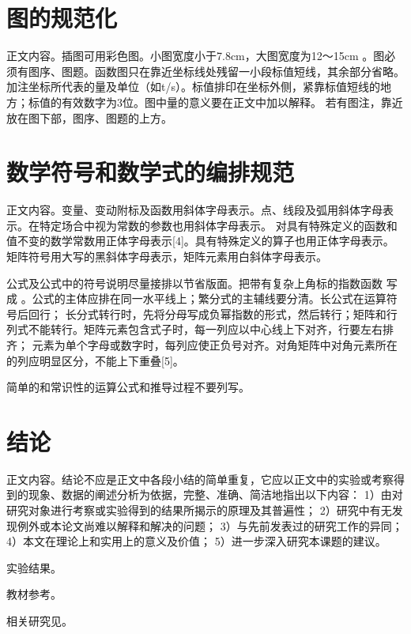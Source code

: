\documentclass[a4paper, zihao=5, UTF8, AutoFakeBold, AutoFakeSlant]{ctexart}
\begin{document}
\section{图的规范化}
正文内容。插图可用彩色图。小图宽度小于7.8cm，大图宽度为12～15cm 。图必须有图序、图题。函数图只在靠近坐标线处残留一小段标值短线，其余部分省略。
加注坐标所代表的量及单位（如t/s）。标值排印在坐标外侧，紧靠标值短线的地方；标值的有效数字为3位。图中量的意义要在正文中加以解释。
若有图注，靠近放在图下部，图序、图题的上方。

\section{数学符号和数学式的编排规范}
正文内容。变量、变动附标及函数用斜体字母表示。点、线段及弧用斜体字母表示。在特定场合中视为常数的参数也用斜体字母表示。
对具有特殊定义的函数和值不变的数学常数用正体字母表示[4]。具有特殊定义的算子也用正体字母表示。矩阵符号用大写的黑斜体字母表示，矩阵元素用白斜体字母表示。\par
公式及公式中的符号说明尽量接排以节省版面。把带有复杂上角标的指数函数 写成 。公式的主体应排在同一水平线上；繁分式的主辅线要分清。长公式在运算符号后回行；
长分式转行时，先将分母写成负幂指数的形式，然后转行；矩阵和行列式不能转行。矩阵元素包含式子时，每一列应以中心线上下对齐，行要左右排齐；
元素为单个字母或数字时，每列应使正负号对齐。对角矩阵中对角元素所在的列应明显区分，不能上下重叠[5]。\par
简单的和常识性的运算公式和推导过程不要列写。\par

\section{结论}
正文内容。结论不应是正文中各段小结的简单重复，它应以正文中的实验或考察得到的现象、数据的阐述分析为依据，完整、准确、简洁地指出以下内容：
1）由对研究对象进行考察或实验得到的结果所揭示的原理及其普遍性；
2）研究中有无发现例外或本论文尚难以解释和解决的问题；
3）与先前发表过的研究工作的异同；
4）本文在理论上和实用上的意义及价值；
5）进一步深入研究本课题的建议。

实验结果\cite{paper1}。

教材参考\cite{book1}。

相关研究见\cite{thesis1}。

\balance  %
\vspace{-6pt}
\printbibliography
[
    heading=bibliography,
    title={参考文献}
]
\end{document}

